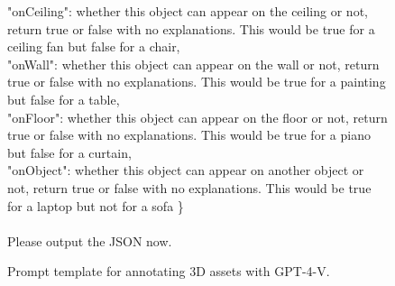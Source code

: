 \begin{figure}[!t]
\begin{center}
\begin{tcolorbox} [top=2pt,bottom=2pt, width=\linewidth, boxrule=1pt]
{{            "onCeiling": whether this object can appear on the ceiling or not, return true or false with no explanations. This would be true for a ceiling fan but false for a chair, \\
            "onWall": whether this object can appear on the wall or not, return true or false with no explanations. This would be true for a painting but false for a table, \\
            "onFloor": whether this object can appear on the floor or not, return true or false with no explanations. This would be true for a piano but false for a curtain, \\
            "onObject": whether this object can appear on another object or not, return true or false with no explanations. This would be true for a laptop but not for a sofa
        \} \\ \\
Please output the JSON now.
}
    \par}
    \end{tcolorbox}

    \end{center}
    \caption{Prompt template for annotating 3D assets with GPT-4-V.}
    \label{fig:prompt-3}
\end{figure}



